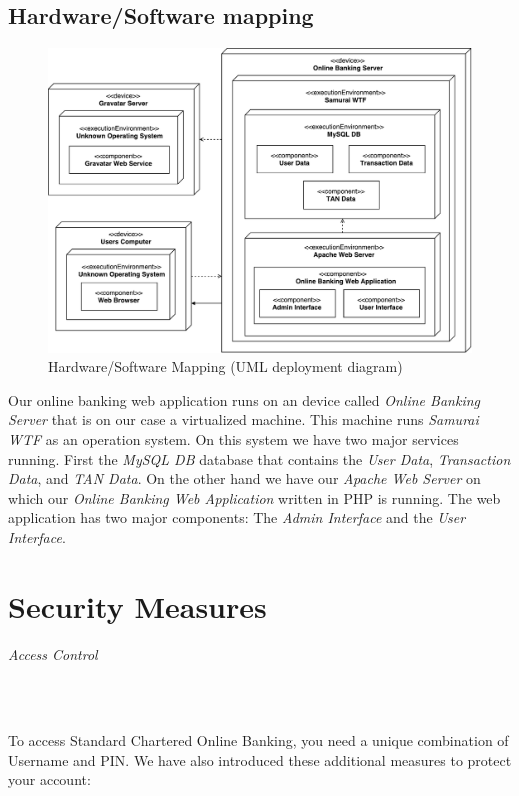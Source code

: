 \documentclass[headsepline,footsepline,footinclude=false,oneside,fontsize=11pt,paper=a4,listof=totoc,bibliography=totoc]{scrbook} %
\begin{document}
\pagebreak
\section{Hardware/Software mapping}

\begin{figure}[!ht]
	\centering
	\includegraphics[scale=0.55]{figures/hw_sw_mapping.pdf}
	\caption{Hardware/Software Mapping (UML deployment diagram)}
	\label{fig1}
\end{figure}

Our online banking web application runs on an device called \textit{Online Banking Server} that is on our case a virtualized machine. This machine runs \textit{Samurai WTF} as an operation system. On this system we have two major services running. First the \textit{MySQL DB} database that contains the \textit{User Data}, \textit{Transaction Data}, and \textit{TAN Data}. On the other hand we have our \textit{Apache Web Server} on which our \textit{Online Banking Web Application} written in PHP is running. The web application has two major components: The \textit{Admin Interface} and the \textit{User Interface}.

\chapter{Security Measures}   

\subparagraph{Access Control}\

To access Standard Chartered Online Banking, you need a unique combination of Username and PIN. We have also introduced these additional measures to protect your account:
\end{document}

